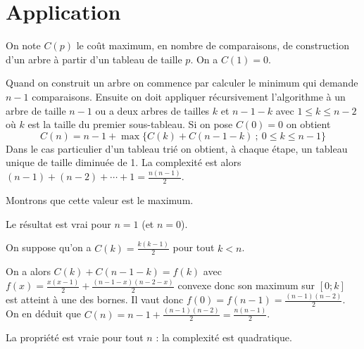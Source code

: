 \section{Application}
\begin{Exercise}
On note $C(p)$ le coût maximum, en nombre de comparaisons, de construction d'un arbre à partir d'un tableau de taille $p$. On a $C(1)=0$.

Quand on construit un arbre on commence par calculer le minimum qui demande $n-1$ comparaisons. Ensuite on doit appliquer récursivement l'algorithme à un arbre de taille $n-1$ ou a deux arbres de tailles $k$ et $n-1-k$ avec $1\le k \le n-2$ où $k$ est la taille du premier sous-tableau. Si on pose $C(0)= 0$ on obtient
\[C(n) = n-1 + \max\bigl\{C(k)+C(n-1-k)\ ;\ 0\le k \le n-1\bigr\}\]
Dans le cas particulier d'un tableau trié on obtient, à chaque étape, un tableau unique de taille diminuée de 1. La complexité est alors $(n-1)+(n-2)+\cdots + 1=\frac{n(n-1)}2$.

Montrons que cette valeur est le maximum.

Le résultat est vrai pour $n= 1$ (et $n =0$).

On suppose qu'on a $C(k) = \frac{k(k-1)}2$ pour tout $k< n$.

On a alors $C(k)+C(n-1-k)=f(k)$ avec $f(x) = \frac{x(x-1)}2+\frac{(n-1-x)(n-2-x)}2$ convexe donc son maximum sur $[0;k]$ est atteint à une des bornes. Il vaut donc $f(0)=f(n-1)=\frac{(n-1)(n-2)}2$. On en déduit que
$C(n)=n-1+\frac{(n-1)(n-2)}2=\frac{n(n-1)}2$.

La propriété est vraie pour tout $n$ : la complexité est quadratique.
\end{Exercise}
